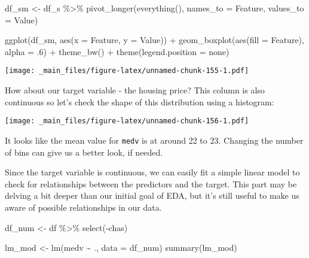 \documentclass[
]{book}
\newenvironment{Shaded}{\begin{snugshade}}{\end{snugshade}}
\newcommand{\AttributeTok}[1]{\textcolor[rgb]{0.77,0.63,0.00}{#1}}
\newcommand{\DecValTok}[1]{\textcolor[rgb]{0.00,0.00,0.81}{#1}}
\newcommand{\FunctionTok}[1]{\textcolor[rgb]{0.00,0.00,0.00}{#1}}
\newcommand{\NormalTok}[1]{#1}
\newcommand{\OtherTok}[1]{\textcolor[rgb]{0.56,0.35,0.01}{#1}}
\newcommand{\SpecialCharTok}[1]{\textcolor[rgb]{0.00,0.00,0.00}{#1}}
\newcommand{\StringTok}[1]{\textcolor[rgb]{0.31,0.60,0.02}{#1}}
\begin{document}
\begin{Shaded}
\begin{Highlighting}[]
\NormalTok{df\_sm }\OtherTok{\textless{}{-}}\NormalTok{ df\_s }\SpecialCharTok{\%\textgreater{}\%} \FunctionTok{pivot\_longer}\NormalTok{(}\FunctionTok{everything}\NormalTok{(), }
                               \AttributeTok{names\_to =} \StringTok{\textquotesingle{}Feature\textquotesingle{}}\NormalTok{, }
                               \AttributeTok{values\_to =} \StringTok{\textquotesingle{}Value\textquotesingle{}}\NormalTok{)}

\FunctionTok{ggplot}\NormalTok{(df\_sm, }\FunctionTok{aes}\NormalTok{(}\AttributeTok{x =}\NormalTok{ Feature, }\AttributeTok{y =}\NormalTok{ Value)) }\SpecialCharTok{+} 
  \FunctionTok{geom\_boxplot}\NormalTok{(}\FunctionTok{aes}\NormalTok{(}\AttributeTok{fill =}\NormalTok{ Feature), }\AttributeTok{alpha =}\NormalTok{ .}\DecValTok{6}\NormalTok{) }\SpecialCharTok{+} 
  \FunctionTok{theme\_bw}\NormalTok{() }\SpecialCharTok{+} \FunctionTok{theme}\NormalTok{(}\AttributeTok{legend.position =} \StringTok{\textquotesingle{}none\textquotesingle{}}\NormalTok{)}
\end{Highlighting}
\end{Shaded}

\texttt{[image: \_main\_files/figure-latex/unnamed-chunk-155-1.pdf]}

How about our target variable - the housing price? This column is also continuous so let's check the shape of this distribution using a histogram:

\begin{Shaded}
\end{Shaded}

\texttt{[image: \_main\_files/figure-latex/unnamed-chunk-156-1.pdf]}

It looks like the mean value for \texttt{medv} is at around 22 to 23. Changing the number of bins can give us a better look, if needed.

Since the target variable is continuous, we can easily fit a simple linear model to check for relationships between the predictors and the target. This part may be delving a bit deeper than our initial goal of EDA, but it's still useful to make us aware of possible relationships in our data.

\begin{Shaded}
\begin{Highlighting}[]
\NormalTok{df\_num }\OtherTok{\textless{}{-}}\NormalTok{ df }\SpecialCharTok{\%\textgreater{}\%} \FunctionTok{select}\NormalTok{(}\SpecialCharTok{{-}}\NormalTok{chas)}

\NormalTok{lm\_mod }\OtherTok{\textless{}{-}} \FunctionTok{lm}\NormalTok{(medv }\SpecialCharTok{\textasciitilde{}}\NormalTok{ ., }\AttributeTok{data =}\NormalTok{ df\_num)}
\FunctionTok{summary}\NormalTok{(lm\_mod)}
\end{Highlighting}
\end{Shaded}
\end{document}
